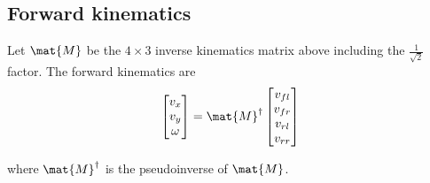 \subsection{Forward kinematics}

Let $\mat{M}$ be the $4 \times 3$ inverse kinematics matrix above including the
$\frac{1}{\sqrt{2}}$ factor. The forward kinematics are
\begin{equation}
  \begin{bmatrix}
    v_x \\
    v_y \\
    \omega
  \end{bmatrix} =
  \mat{M}^\dagger
  \begin{bmatrix}
    v_{fl} \\
    v_{fr} \\
    v_{rl} \\
    v_{rr}
  \end{bmatrix}
\end{equation}

where $\mat{M}^\dagger$ is the pseudoinverse of $\mat{M}$.
